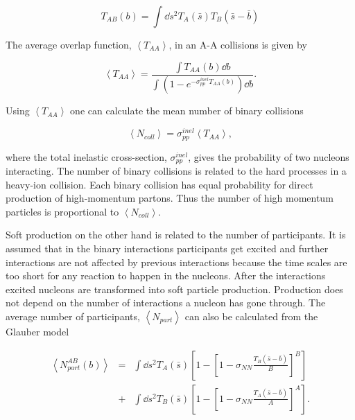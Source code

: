 \begin{equation}
T_{AB}\left(b\right)=\int \dd  s^2 T_A\left(\bar s\right) T_B\left(\bar s - \bar b\right)
\end{equation}

\noindent The average overlap function, $\left<T_{AA}\right>$, in an A-A collisions  is given by~\cite{Afanasiev:2009aa}

\begin{equation}
\left<T_{AA}\right>=\frac{\int T_{AA}\left(b\right) \dd b}
{\int\left(1-e^{-\sigma^{inel}_{pp}T_{AA}\left(b\right)}\right)\dd b}.
\end{equation}

\noindent Using $\left<T_{AA}\right>$ one can calculate the mean number of binary collisions

\begin{equation}
\left<N_{coll}\right>=\sigma_{pp}^{inel}\left<T_{AA}\right>,
\end{equation}

\noindent where the total inelastic cross-section, $\sigma_{pp}^{inel}$, gives the probability of two nucleons interacting. The number of binary collisions is related to the hard processes in a heavy-ion collision. Each binary collision has equal probability for direct production of high-momentum partons. Thus the number of high momentum particles is proportional to $\left<N_{coll}\right>$.

Soft production on the other hand is related to the number of participants. It is assumed that in the binary interactions participants get excited and further interactions are not affected by previous interactions because the time scales are too short for any reaction to happen in the nucleons. After the interactions excited nucleons are transformed into soft particle production. Production does not depend on the number of interactions a nucleon has gone through. The average number of participants, $\left<N_{part}\right>$ can also be calculated from the Glauber model 


\begin{eqnarray}
\left<N_{part}^{AB}\left(b\right)\right>&=&\int \dd  s^2 T_A\left(\bar s\right)\left[1-\left[1-\sigma_{NN}\frac{T_B\left(\bar s - \bar b\right)}{B}\right]^B\right] \nonumber \\
 &+ &\int \dd s^2 T_B\left(\bar s\right)\left[1-\left[1-\sigma_{NN}\frac{T_A\left(\bar s - \bar b\right)}{A}\right]^A\right].
\end{eqnarray}

%
%
%
%
%
%
%
%
%
%
%


